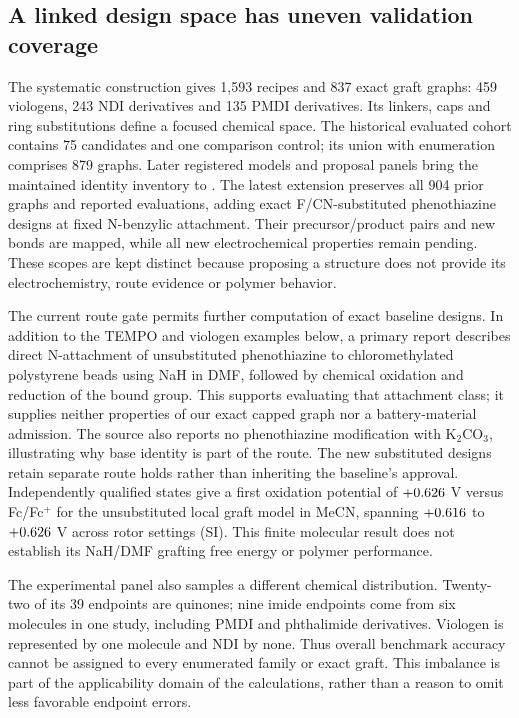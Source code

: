 \documentclass[11pt]{article}
\begin{document}
\subsection{A linked design space has uneven validation coverage}
The systematic construction gives 1,593 recipes and 837 exact graft graphs: 459 viologens, 243 NDI derivatives and 135 PMDI derivatives. Its linkers, caps and ring substitutions define a focused chemical space. The historical evaluated cohort contains 75 candidates and one comparison control; its union with enumeration comprises 879 graphs. Later registered models and proposal panels bring the maintained identity inventory to \UnifiedRegistryCount{}. The latest extension preserves all 904 prior graphs and reported evaluations, adding \NewDirectPTZDesigns{} exact F/CN-substituted phenothiazine designs at fixed N-benzylic attachment. Their precursor/product pairs and new bonds are mapped, while all new electrochemical properties remain pending. These scopes are kept distinct because proposing a structure does not provide its electrochemistry, route evidence or polymer behavior.

The current route gate permits further computation of \ReviewedRouteCount{} exact baseline designs. In addition to the TEMPO and viologen examples below, a primary report describes direct N-attachment of unsubstituted phenothiazine to chloromethylated polystyrene beads using NaH in DMF, followed by chemical oxidation and reduction of the bound group.\cite{wright1989supported} This supports evaluating that attachment class; it supplies neither properties of our exact capped graph nor a battery-material admission. The source also reports no phenothiazine modification with K$_2$CO$_3$, illustrating why base identity is part of the route. The new substituted designs retain separate route holds rather than inheriting the baseline's approval. Independently qualified states give a first oxidation potential of $+0.626$ V versus Fc/Fc$^+$ for the unsubstituted local graft model in MeCN, spanning $+0.616$ to $+0.626$ V across rotor settings (SI). This finite molecular result does not establish its NaH/DMF grafting free energy or polymer performance.

The experimental panel also samples a different chemical distribution. Twenty-two of its 39 endpoints are quinones; nine imide endpoints come from six molecules in one study, including PMDI and phthalimide derivatives. Viologen is represented by one molecule and NDI by none. Thus overall benchmark accuracy cannot be assigned to every enumerated family or exact graft. This imbalance is part of the applicability domain of the calculations, rather than a reason to omit less favorable endpoint errors.
\end{document}
